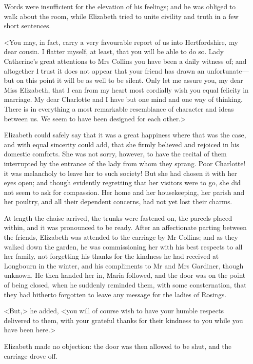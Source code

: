 Words were insufficient for the elevation of his feelings; and he was obliged to walk about the room, while Elizabeth tried to unite civility and truth in a few short sentences.

<You may, in fact, carry a very favourable report of us into Hertfordshire, my dear cousin. I flatter myself, at least, that you will be able to do so. Lady Catherine's great attentions to Mrs Collins you have been a daily witness of; and altogether I trust it does not appear that your friend has drawn an unfortunate—but on this point it will be as well to be silent. Only let me assure you, my dear Miss Elizabeth, that I can from my heart most cordially wish you equal felicity in marriage. My dear Charlotte and I have but one mind and one way of thinking. There is in everything a most remarkable resemblance of character and ideas between us. We seem to have been designed for each other.>

Elizabeth could safely say that it was a great happiness where that was the case, and with equal sincerity could add, that she firmly believed and rejoiced in his domestic comforts. She was not sorry, however, to have the recital of them interrupted by the entrance of the lady from whom they sprang. Poor Charlotte! it was melancholy to leave her to such society! But she had chosen it with her eyes open; and though evidently regretting that her visitors were to go, she did not seem to ask for compassion. Her home and her housekeeping, her parish and her poultry, and all their dependent concerns, had not yet lost their charms.

At length the chaise arrived, the trunks were fastened on, the parcels placed within, and it was pronounced to be ready. After an affectionate parting between the friends, Elizabeth was attended to the carriage by Mr Collins; and as they walked down the garden, he was commissioning her with his best respects to all her family, not forgetting his thanks for the kindness he had received at Longbourn in the winter, and his compliments to Mr and Mrs Gardiner, though unknown. He then handed her in, Maria followed, and the door was on the point of being closed, when he suddenly reminded them, with some consternation, that they had hitherto forgotten to leave any message for the ladies of Rosings.

<But,> he added, <you will of course wish to have your humble respects delivered to them, with your grateful thanks for their kindness to you while you have been here.>

Elizabeth made no objection: the door was then allowed to be shut, and the carriage drove off.

